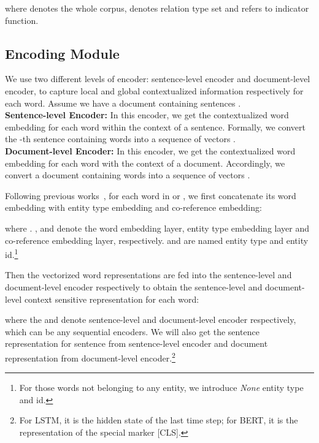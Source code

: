 \documentclass[11pt,a4paper]{article}
\begin{document}
where  denotes the whole corpus,  denotes relation type set and  refers to indicator function.





























\iffalse
\subsection{Encoding Module\label{ssec:encoding}}
We use two different levels of encoder: sentence-level encoder and document-level encoder, to capture local and global contextualized information respectively for each word. Assume we have a document  containing  sentences . \\
\noindent
\textbf{Sentence-level Encoder:} In this encoder, we get the contextualized word embedding for each word within the context of a sentence. Formally, we convert the -th sentence  containing  words  into a sequence of vectors . \\
\noindent
\textbf{Document-level Encoder:} In this encoder, we get the contextualized word embedding for each word with the context of a document. Accordingly, we convert a document  containing  words   into a sequence of vectors .

Following previous works~\citep{DocRED-paper, GAIN}, for each word  in  or , we first concatenate its word embedding with entity type embedding and co-reference embedding:

where .  ,  and  denote the word embedding layer, entity type embedding layer and co-reference embedding layer, respectively.  and  are named entity type and entity id.\footnote{For those words not belonging to any entity, we introduce \textit{None} entity type and id.}

Then the vectorized word representations are fed into the sentence-level and document-level encoder respectively to obtain the sentence-level and document-level context sensitive representation for each word:


where the  and  denote sentence-level and document-level encoder respectively, which can be any sequential encoders. We will also get the sentence representation  for sentence  from sentence-level encoder and document representation  from document-level encoder.\footnote{For LSTM, it is the hidden state of the last time step; for BERT, it is the representation of the special marker [CLS].}
\end{document}
